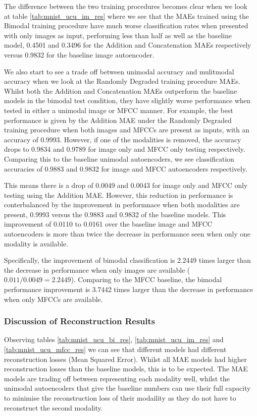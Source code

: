 The difference between the two training procedures becomes clear when we look at table \ref{tab:mnist_ucu_im_res} where we see that the MAEs trained using the Bimodal training procedure have much worse classification rates when presented with only images as input, performing less than half as well as the baseline model, 0.4501 and 0.3496 for the Addition and Concatenation MAEs respectively versus 0.9832 for the baseline image autoencoder.

We also start to see a trade off between unimodal accuracy and mulitmodal accuracy when we look at the Randomly Degraded training procedure MAEs. Whilst both the Addition and Concatenation MAEs outperform the baseline models in the bimodal test condition, they have slightly worse performance when tested in either a unimodal image or MFCC manner. For example, the best performance is given by the Addition MAE under the Randomly Degraded training procedure when both images and MFCCs are present as inputs, with an accuracy of 0.9993. However, if one of the modalities is removed, the accuracy drops to 0.9834 and 0.9789 for image only and MFCC only testing respectively. Comparing this to the baseline unimodal autoencoders, we see classification accuracies of 0.9883 and 0.9832 for image and MFCC autoencoders respectively. 

This means there is a drop of 0.0049 and 0.0043 for image only and MFCC only testing using the Addition MAE. However, this reduction in performance is conterbalanced by the improvement in performnace when both modalities are present, 0.9993 versus the 0.9883 and 0.9832 of the baseline models. This improvement of 0.0110 to 0.0161 over the baseline image and MFCC autoencoders is more than twice the decrease in performance seen when only one modality is available. 

Specifically, the improvement of bimodal classification is 2.2449 times larger than the decrease in performance when only images are available ($0.011 / 0.0049 = 2.2449$). Comparing to the MFCC baseline, the bimodal performance improvement is 3.7442 times larger than the decrease in performance when only MFCCs are available.

\subsubsection{Discussion of Reconstruction Results}
Observing tables \ref{tab:mnist_ucu_bi_res}, \ref{tab:mnist_ucu_im_res} and \ref{tab:mnist_ucu_mfcc_res} we can see that different models had different reconstruction losses (Mean Squared Error). Whilst all MAE models had higher reconstruction losses than the baseline models, this is to be expected. The MAE models are trading off between representing each modality well, whilst the unimodal autoencoders that give the baseline numbers can use their full capacity to minimise the reconstruction loss of their modaility as they do not have to reconstruct the second modality. 

